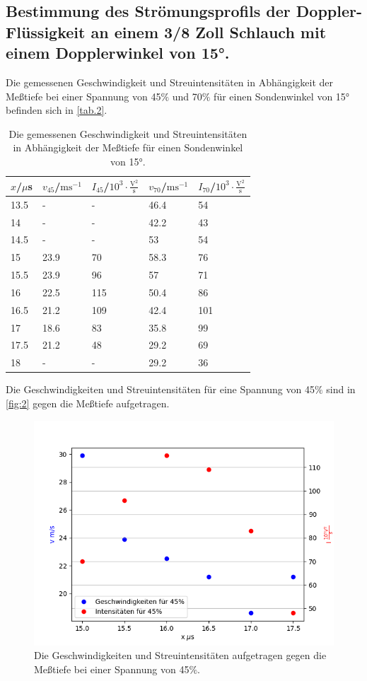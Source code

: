 \subsection{Bestimmung des Strömungsprofils der Doppler-Flüssigkeit an einem 3/8 Zoll Schlauch
mit einem Dopplerwinkel von 15°.}
Die gemessenen Geschwindigkeit und Streuintensitäten in Abhängigkeit der Meßtiefe bei einer Spannung von 45$\%$ und 70$\%$ für einen Sondenwinkel von 15° befinden sich in \autoref{tab.2}.
\begin{table}[H]
  \centering
  \caption{Die gemessenen Geschwindigkeit und Streuintensitäten in Abhängigkeit der Meßtiefe für einen Sondenwinkel von 15°.}
  \begin{tabular}{l|l|l|l|l}
  $x$/$\mu$s & $v_{45}$/$\textrm{ms}^{-1}$ & $I_{45}$/$10^3\cdot\frac{\textrm{V}^2}{\textrm{s}}$ & $v_{70}$/$\textrm{ms}^{-1}$ & $I_{70}$/$10^3\cdot\frac{\textrm{V}^2}{\textrm{s}}$\\ \hline
  13.5 & - & - & 46.4 & 54\\
  14 & - & - & 42.2 & 43\\
  14.5 & - & - & 53 & 54\\
  15 & 23.9 & 70 & 58.3 & 76\\
  15.5 & 23.9 & 96 & 57 & 71\\
  16 & 22.5 & 115 & 50.4 & 86\\
  16.5 & 21.2 & 109 & 42.4 & 101\\
  17 & 18.6 & 83 & 35.8 & 99\\
  17.5 & 21.2 & 48 & 29.2 & 69\\
  18 & - & - & 29.2 & 36\\
  \end{tabular}
  \label{tab.2}
\end{table}
Die Geschwindigkeiten und Streuintensitäten für eine Spannung von 45$\%$ sind in \autoref{fig:2} gegen die Meßtiefe aufgetragen.
\begin{figure}[H]
  \centering
  \includegraphics[width=12cm]{content/2}
  \caption{Die Geschwindigkeiten und Streuintensitäten aufgetragen gegen die Meßtiefe bei einer Spannung von 45$\%$.}
  \label{fig:2}
\end{figure}
